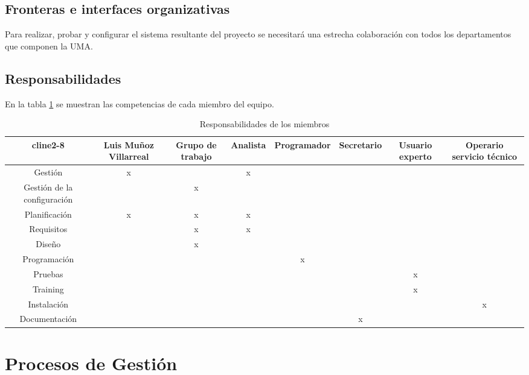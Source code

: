 \documentclass[11pt,a4paper,spanish,twoside]{report}
\begin{document}
\section{Fronteras e interfaces organizativas}
Para realizar, probar y configurar el sistema resultante del proyecto se 
necesitará una estrecha colaboración con todos los departamentos que componen 
la UMA. 
\section{Responsabilidades}
En la tabla \ref{Tab:Respon} se muestran las competencias de cada miembro del
  equipo.
\begin{table}[!h]
\centering
  \begin{tabular}{c|c|c|c|c|c|c|c}
  cline{2-8}&\textbf{Luis Muñoz Villarreal} & \textbf{Grupo de trabajo} &
  \textbf{Analista} & \textbf{Programador} & \textbf{Secretario} &
  \textbf{Usuario experto} & \textbf{Operario servicio técnico}\\
    \hline \hline
    Gestión                     & x &   & x &   &   &   &    \\ 
    \hline
    Gestión de la configuración &   & x &   &   &   &   &    \\
    \hline
    Planificación               & x & x & x &   &   &   &    \\
    \hline
    Requisitos                  &   & x & x &   &   &   &    \\
    \hline
    Diseño                      &   & x &   &   &   &   &    \\
    \hline
    Programación                &   &   &   & x &   &   &    \\
    \hline
    Pruebas                     &   &   &   &   &   & x &    \\
    \hline
    Training                    &   &   &   &   &   & x &    \\
    \hline
    Instalación                 &   &   &   &   &   &   & x  \\
    \hline
    Documentación               &   &   &   &   & x &   &    \\
  \end{tabular}
  \caption{Responsabilidades de los miembros} \label{Tab:Respon}
\end{table}
\chapter{Procesos de Gestión}
\end{document}
